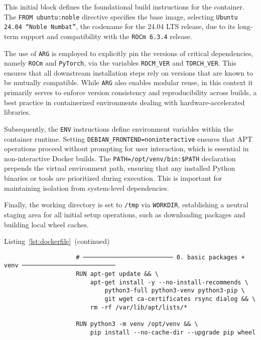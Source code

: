 This initial block defines the foundational build instructions for the container. The \texttt{FROM ubuntu:noble} directive specifies the base image, selecting \texttt{Ubuntu 24.04 “Noble Numbat”}, the codename for the 24.04 LTS release, due to its long-term support and compatibility with the \texttt{ROCm 6.3.4} release.

The use of \texttt{ARG} is employed to explicitly pin the versions of critical dependencies, namely \texttt{ROCm} and \texttt{PyTorch}, via the variables \texttt{ROCM\_VER} and \texttt{TORCH\_VER}. This ensures that all downstream installation steps rely on versions that are known to be mutually compatible. While \texttt{ARG} also enables modular reuse, in this context it primarily serves to enforce version consistency and reproducibility across builds, a best practice in containerized environments dealing with hardware-accelerated libraries.

Subsequently, the \texttt{ENV} instructions define environment variables within the container runtime. Setting \texttt{DEBIAN\_FRONTEND=noninteractive} ensures that APT operations proceed without prompting for user interaction, which is essential in non-interactive Docker builds. The \texttt{PATH=/opt/venv/bin:\$PATH} declaration prepends the virtual environment path, ensuring that any installed Python binaries or tools are prioritized during execution. This is important for maintaining isolation from system-level dependencies.

Finally, the working directory is set to \texttt{/tmp} via \texttt{WORKDIR}, establishing a neutral staging area for all initial setup operations, such as downloading packages and building local wheel caches.

\vspace{1em}

\begin{minipage}{\textwidth}
	\captionsetup{type=listing}
	\caption*{Listing~\ref{lst:dockerfile}~(continued)}

	\begin{verbatim}
                    # ───────────────────────── 0. basic packages + venv ──────────────────────────
                    RUN apt-get update && \
                        apt-get install -y --no-install-recommends \
                            python3-full python3-venv python3-pip \
                            git wget ca-certificates rsync dialog && \
                        rm -rf /var/lib/apt/lists/*

                    RUN python3 -m venv /opt/venv && \
                        pip install --no-cache-dir --upgrade pip wheel

    \end{verbatim}
\end{minipage}

